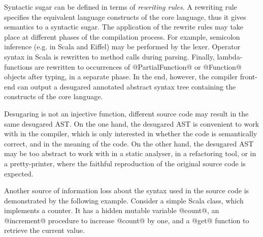 \documentclass[11pt]{amsart}
\begin{document}
Syntactic sugar can be defined in terms of \emph{rewriting rules}.  A
rewriting rule specifies the equivalent language constructs of the
core language, thus it gives semantics to a syntactic sugar. The
application of the rewrite rules may take place at different phases of
the compilation process. For example, semicolon inference (e.g. in
Scala and Eiffel) may be performed by the lexer. Operator syntax in
Scala is rewritten to method calls during parsing.  Finally,
lambda-functions are rewritten to occurrences of @PartialFunction@ or
@Function@ objects after typing, in a separate phase.  In the end,
however, the compiler front-end can output a desugared annotated
abstract syntax tree containing the constructs of the core language.

Desugaring is not an injective function, different source
code may result in the same desugared AST. 
On the one hand, the desugared AST is convenient to work with in the compiler, which
is only interested in whether the code is semantically correct, and
in the meaning of the code. On the other hand, the desugared AST
may be too abstract to work with in a static analyser, in a refactoring
tool, or in a pretty-printer, where the faithful reproduction of the original source
code is expected. 

Another source of information loss about the syntax used in the source code
is demonstrated by the following example. Consider a simple Scala
class, which implements a counter.
It has a hidden mutable variable @count@, 
an @increment@ procedure to increase @count@ by one, and
a @get@ function to retrieve the current value.
\end{document}
